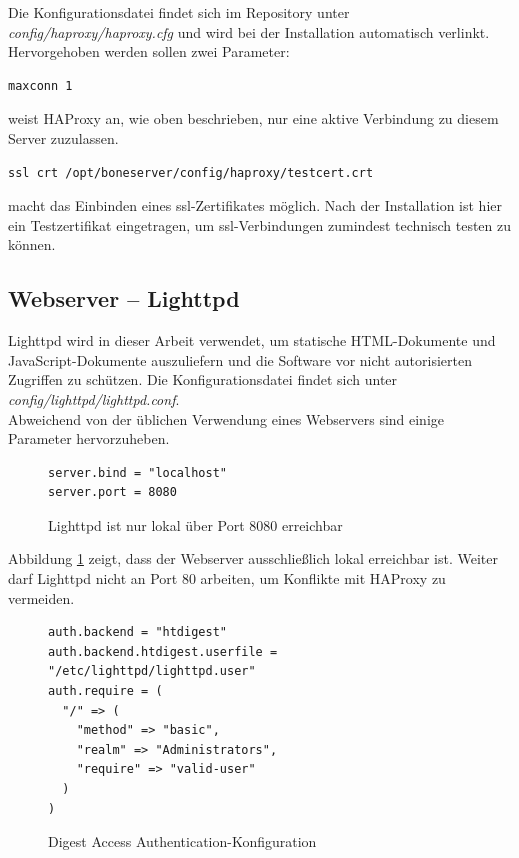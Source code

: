 Die Konfigurationsdatei findet sich im Repository unter \textit{config/haproxy/haproxy.cfg} und wird bei der Installation automatisch verlinkt.
Hervorgehoben werden sollen zwei Parameter:

\begin{lstlisting}
maxconn 1
\end{lstlisting}
weist HAProxy an, wie oben beschrieben, nur eine aktive Verbindung zu diesem Server zuzulassen.

\begin{lstlisting}
ssl crt /opt/boneserver/config/haproxy/testcert.crt
\end{lstlisting}
macht das Einbinden eines \gls{ssl}-Zertifikates möglich. Nach der Installation ist hier ein Testzertifikat eingetragen, um \gls{ssl}-Verbindungen zumindest technisch testen zu können.


\subsection{Webserver -- Lighttpd}
\label{subsec:Lighttpd}
Lighttpd wird in dieser Arbeit verwendet, um statische HTML-Dokumente und JavaScript-Dokumente auszuliefern und die Software vor nicht autorisierten Zugriffen zu schützen. Die Konfigurationsdatei findet sich unter \textit{config/lighttpd/lighttpd.conf}.\\

Abweichend von der üblichen Verwendung eines Webservers sind einige Parameter hervorzuheben.

\begin{figure}[ht]
\begin{lstlisting}
server.bind = "localhost"
server.port = 8080
\end{lstlisting}
\caption{Lighttpd ist nur lokal über Port 8080 erreichbar}
\label{lst:lighttpdLocal}
\end{figure}

Abbildung \ref{lst:lighttpdLocal} zeigt, dass der Webserver ausschließlich lokal erreichbar ist. Weiter darf Lighttpd nicht an Port 80 arbeiten, um Konflikte mit HAProxy zu vermeiden.\\

\begin{figure}[ht]
\begin{lstlisting}
auth.backend = "htdigest"
auth.backend.htdigest.userfile = "/etc/lighttpd/lighttpd.user"
auth.require = (
  "/" => (
    "method" => "basic",
    "realm" => "Administrators",
    "require" => "valid-user"
  )
)
\end{lstlisting}
\caption{Digest Access Authentication-Konfiguration}
\label{lst:lighttpdhtdigest}
\end{figure}

